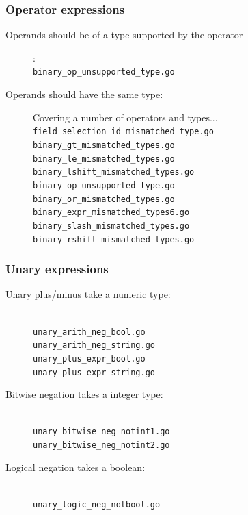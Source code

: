 \documentclass[oneside]{article}
\begin{document}
\subsubsection{Operator expressions}
\begin{description}
  \item[Operands should be of a type supported by the operator]: \\
    \verb|binary_op_unsupported_type.go|
  \item[Operands should have the same type:] Covering a number of operators and types...\\
    \verb|field_selection_id_mismatched_type.go|\\
    \verb|binary_gt_mismatched_types.go|\\
    \verb|binary_le_mismatched_types.go|\\
    \verb|binary_lshift_mismatched_types.go|\\
    \verb|binary_op_unsupported_type.go	|\\
    \verb|binary_or_mismatched_types.go|\\
    \verb|binary_expr_mismatched_types6.go|\\
    \verb|binary_slash_mismatched_types.go|\\
    \verb|binary_rshift_mismatched_types.go|
\end{description}


\subsubsection{Unary expressions}
\begin{description}
  \item[Unary plus/minus take a numeric type:] \ \\
    \verb|unary_arith_neg_bool.go|\\
    \verb|unary_arith_neg_string.go|\\
    \verb|unary_plus_expr_bool.go|\\
    \verb|unary_plus_expr_string.go|
  \item[Bitwise negation takes a integer type:] \ \\
    \verb|unary_bitwise_neg_notint1.go|\\
    \verb|unary_bitwise_neg_notint2.go|
  \item[Logical negation takes a boolean:] \ \\
    \verb|unary_logic_neg_notbool.go|
\end{description}
\end{document}
